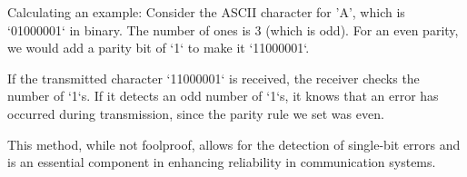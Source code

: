 Calculating an example:
Consider the ASCII character for 'A', which is `01000001` in binary. The number of ones is 3 (which is odd). For an even parity, we would add a parity bit of `1` to make it `11000001`.

If the transmitted character `11000001` is received, the receiver checks the number of `1`s. If it detects an odd number of `1`s, it knows that an error has occurred during transmission, since the parity rule we set was even.

This method, while not foolproof, allows for the detection of single-bit errors and is an essential component in enhancing reliability in communication systems. 

